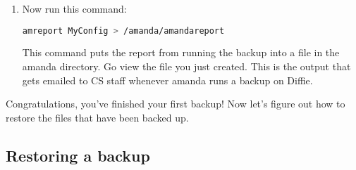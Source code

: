 \documentclass{article}
\begin{document}
\begin{enumerate}
\item Now run this command:

\begin{lstlisting}[basicstyle=\ttfamily, backgroundcolor = \color{lightgray}, language = bash, xleftmargin = 0cm, framexleftmargin = 1em]
amreport MyConfig > /amanda/amandareport
\end{lstlisting}

This command puts the report from running the backup into a file in the amanda directory. Go view the file you just created. This is the output that gets emailed to CS staff whenever amanda runs a backup on Diffie.

\end{enumerate}

Congratulations, you've finished your first backup! Now let's figure out how to restore the files that have been backed up.


\subsection*{Restoring a backup}
\end{document}
